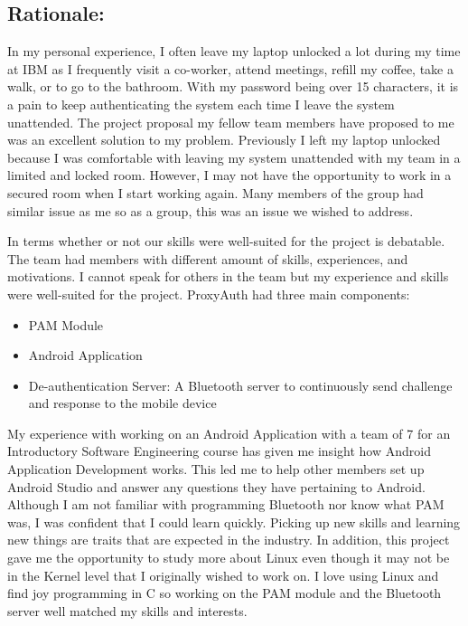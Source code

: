 \documentclass[letterpaper,twocolumn,10pt]{article}
\begin{document}
\subsection{Rationale:}
In my personal experience, I often leave my laptop unlocked a lot during my time at IBM as I frequently visit a co-worker, attend meetings, refill my coffee, take a walk, or to go to the bathroom. With my password being over 15 characters, it is a pain to keep authenticating the system each time I leave the system unattended. The project proposal my fellow team members have proposed to me was an excellent solution to my problem. Previously I left my laptop unlocked because I was comfortable with leaving my system unattended with my team in a limited and locked room. However, I may not have the opportunity to work in a secured room when I start working again. Many members of the group had similar issue as me so as a group, this was an issue we wished to address. 

In terms whether or not our skills were well-suited for the project is debatable. The team had members with different amount of skills, experiences, and motivations. I cannot speak for others in the team but my experience and skills were well-suited for the project. ProxyAuth had three main components:
\begin{itemize}[noitemsep]
\item PAM Module
\item Android Application
\item De-authentication Server: A Bluetooth server to continuously send challenge and response to the mobile device  
\end{itemize}

My experience with working on an Android Application with a team of 7 for an Introductory Software Engineering course has given me insight how Android Application Development works. This led me to help other members set up Android Studio and answer any questions they have pertaining to Android. Although I am not familiar with programming Bluetooth nor know what PAM was, I was confident that I could learn quickly. Picking up new skills and learning new things are traits that are expected in the industry. In addition, this project gave me the opportunity to study more about Linux even though it may not be in the Kernel level that I originally wished to work on. I love using Linux and find joy programming in C so working on the PAM module and the Bluetooth server well matched my skills and interests.
\end{document}

